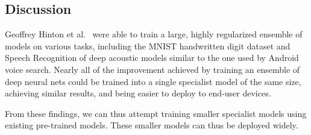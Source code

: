 \subsection{Discussion}

Geoffrey Hinton et al.~\cite{hinton2015distilling} were able to train a large, highly regularized
ensemble of models on various tasks, including the MNIST handwritten digit dataset and Speech 
Recognition of deep acoustic models similar to the one used by Android voice search. Nearly all of the improvement achieved by training an ensemble of deep neural nets could be trained into a single specialist
model of the same size, achieving similar results, and being easier to deploy to end-user devices.

From these findings, we can thus attempt training smaller specialist models using existing pre-trained models.
These smaller models can thus be deployed widely.
